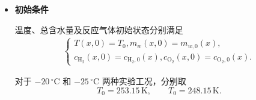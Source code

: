 \documentclass[bwprint]{gmcmthesis}
\numberwithin{figure}{section}
\begin{document}
\begin{itemize}
\begin{enumerate}
    \item GDL 与 CL 均视为连续、均匀的多孔介质，PEM 采用题给膜模型；双极板视为连续、均匀致密固体；
    \item 仅考虑沿膜电极厚度方向的传质与传热，忽略面内非均匀性；
    \item 反应气体满足理想气体状态方程；
    \item 催化层内采用平均电化学反应速率，反应电流沿催化层厚度均匀分布；
    \item 外部加载电流密度 \(j(t)\) 为已知输入；
    \item 冰为静止、刚性的固相，不发生宏观迁移，只能通过冻结、融化、凝华和升华生成或消失；
    \item 在 GDL 和 CL 中，液态水与冰共同占据原始孔隙，冰生成后固定于当前位置；
    \item 水的三类相变均采用有限速率非平衡模型，相变方向由局部温度、饱和状态和当前相库存共同确定；
    \item 初始孔隙液态水、孔隙水蒸气及冰均取零，PEM 保留附件给定的初始膜含水量；
    \item 十种相变过程采用统一的一阶有限速率框架，不额外引入成核等待或 JMAK 型结晶动力学；
    \item 双极板内只考虑储热和导热，不发生水迁移、相变和电化学反应；
    \item BP/GDL 界面采用理想热接触，温度及法向热流连续，不另设置热接触电阻；
    \item 双极板电学上作为理想集流体处理，原模型中的面积比接触电阻 \(R_c\) 保持不变，不重复设置板体附加接触电阻；
    \item 含双极板模型的环境对流边界作用于两侧 BP 外表面，MEA 与双极板初温均等于环境温度。
\end{enumerate}

 这一处理使模型在保持一维性的同时，将真正影响短时冷启动的水--冰相变、冰堵和热惯性纳入统一框架。

\item \textbf {初始条件}

 温度、总含水量及反应气体初始状态分别满足
\begin{align}
\begin{cases}
T(x,0)= T_0,  m_w(x,0) = m_{w,0}(x),\\
c_{\text{H}_2}(x,0)=c_{\text{H}_2,0}(x),  c_{\text{O}_2}(x,0) = c_{\text{O}_2,0}(x). \tag{4-8}
\end{cases}
\end{align}

 对于 \(-20\,^\circ\text{C}\) 和 \(-25\,^\circ\text{C}\) 两种实验工况，分别取
\begin{equation}
T_0 = 253.15\,\text{K}, \qquad T_0 = 248.15\,\text{K}.
\tag{4-9}
\end{equation}


\end{itemize}
\end{document}
